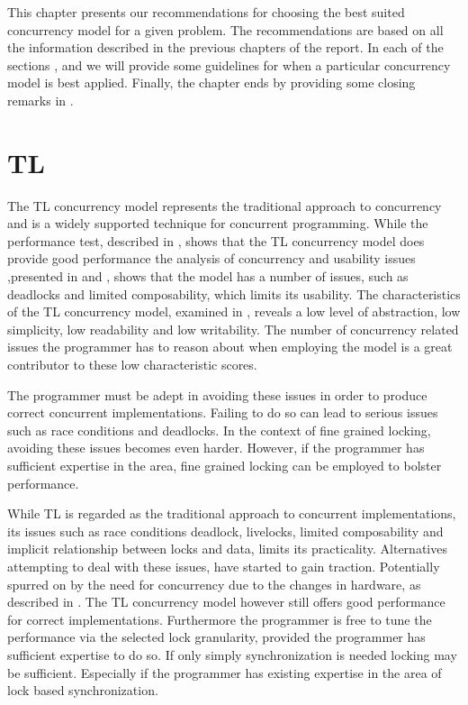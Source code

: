 \makeatletter {}\makeatother
{}
This chapter presents our recommendations for choosing the best suited concurrency model for a given problem. The recommendations are based on all the information described in the previous chapters of the report. In each of the sections ,  and  we will provide some guidelines for when a particular concurrency model is best applied. Finally, the chapter ends by providing some closing remarks in .

\label{chap:choosing_con_model}

\section{\acl{TL}}\label{sec:choose_TL}
The \ac{TL} concurrency model represents the traditional approach to concurrency\cite{saha2006mcrt} and is a widely supported technique for concurrent programming. While the performance test, described in , shows that the \ac{TL} concurrency model does provide good performance the analysis of concurrency and usability issues ,presented in  and , shows that the model has a number of issues, such as deadlocks and limited composability, which limits its usability. The characteristics of the \ac{TL} concurrency model, examined in , reveals a low level of abstraction, low simplicity, low readability and low writability. The number of concurrency related issues the programmer has to reason about when employing the model is a great contributor to these low characteristic scores.

The programmer must be adept in avoiding these issues in order to produce correct concurrent implementations. Failing to do so can lead to serious issues such as race conditions and deadlocks. In the context of fine grained locking, avoiding these issues becomes even harder. However, if the programmer has sufficient expertise in the area, fine grained locking can be employed to bolster performance.

While \ac{TL} is regarded as the traditional approach to concurrent implementations\cite{saha2006mcrt}, its issues such as race conditions deadlock, livelocks, limited composability and implicit relationship between locks and data, limits its practicality. Alternatives attempting to deal with these issues, have started to gain traction. Potentially spurred on by the need for concurrency due to the changes in hardware, as described in . The \ac{TL} concurrency model however still offers good performance for correct implementations. Furthermore the programmer is free to tune the performance via the selected lock granularity, provided the programmer has sufficient expertise to do so. If only simply synchronization is needed locking may be sufficient. Especially if the programmer has existing expertise in the area of lock based synchronization. 

